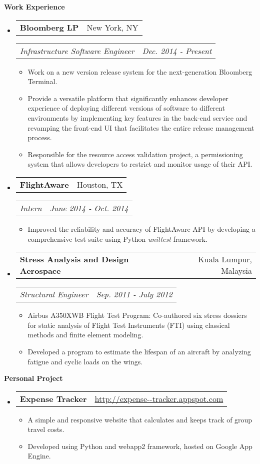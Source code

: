 \documentclass[letterpaper,11pt]{article}
\makeatletter
\newcommand{\resitem}[1]{\item #1 \vspace{-2pt}}
\newcommand{\resheading}[1]{{\begin{mdframed}[backgroundcolor=mygray]{\large \textbf{#1}}\end{mdframed}}}
\newcommand{\restitle}[2]{
\begin{tabular*}{7.0in}{l@{\extracolsep{\fill}}r}
		\textbf{#1} & #2 \\
\end{tabular*}}
\newcommand{\ressubtitle}[2]{
\begin{tabular*}{7.0in}{l@{\extracolsep{\fill}}r}
		\textit{#1} & \textit{#2} \\
\end{tabular*}\vspace{-6pt}}
\makeatother
\begin{document}
\resheading{Work Experience}
\begin{itemize}

\item
	\restitle{Bloomberg LP}{New York, NY}
	\ressubtitle{Infrastructure Software Engineer}{Dec. 2014 - Present}
	\begin{itemize}
		\resitem{Work on a new version release system for the next-generation Bloomberg Terminal.}
		\resitem{Provide a versatile platform that significantly enhances developer experience of deploying different versions of software to different environments by implementing key features in the back-end service and revamping the front-end UI that facilitates the entire release management process.}
		\resitem{Responsible for the resource access validation project, a permissioning system that allows developers to restrict and monitor usage of their API.}
	\end{itemize}

\item
	\restitle{FlightAware}{Houston, TX}
	\ressubtitle{Intern}{June 2014 - Oct. 2014}
	\begin{itemize}
		\resitem{Improved the reliability and accuracy of FlightAware API by developing a comprehensive test suite using Python \emph{unittest} framework.}
	\end{itemize}

\item
	\restitle{Stress Analysis and Design Aerospace}{Kuala Lumpur, Malaysia}
	\ressubtitle{Structural Engineer}{Sep. 2011 - July 2012}
	\begin{itemize}
		\resitem{Airbus A350XWB Flight Test Program: Co-authored six stress dossiers for static analysis of Flight Test Instruments (FTI) using classical methods and finite element modeling.}
		\resitem{Developed a program to estimate the lifespan of an aircraft by analyzing fatigue and cyclic loads on the wings.}
	\end{itemize}

\end{itemize}

\resheading{Personal Project}

\begin{itemize}
\item
	\restitle{Expense Tracker}{\href{http://expense--tracker.appspot.com/}{http://expense-{}-tracker.appspot.com}}
	\vspace{-6pt}
	\begin{itemize}
		\resitem{A simple and responsive website that calculates and keeps track of group travel costs.}
		\resitem{Developed using Python and webapp2 framework, hosted on Google App Engine.}
	\end{itemize}
\end{itemize}
\end{document}
